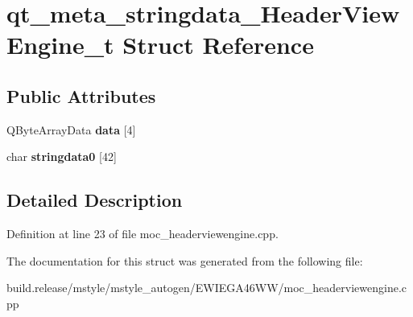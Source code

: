 \hypertarget{structqt__meta__stringdata___header_view_engine__t}{}\section{qt\+\_\+meta\+\_\+stringdata\+\_\+\+Header\+View\+Engine\+\_\+t Struct Reference}
\label{structqt__meta__stringdata___header_view_engine__t}
\subsection*{Public Attributes}
\begin{DoxyCompactItemize}
\item 
\mbox{\label{structqt__meta__stringdata___header_view_engine__t_a77814f1a2f2e2274ae135c850896cfdb}} 
Q\+Byte\+Array\+Data {\bfseries data} \mbox{[}4\mbox{]}
\item 
\mbox{\label{structqt__meta__stringdata___header_view_engine__t_a27b8ca00bbcbbdb67ede11d5e5d45a6b}} 
char {\bfseries stringdata0} \mbox{[}42\mbox{]}
\end{DoxyCompactItemize}


\subsection{Detailed Description}


Definition at line 23 of file moc\+\_\+headerviewengine.\+cpp.



The documentation for this struct was generated from the following file\+:\begin{DoxyCompactItemize}
\item 
build.\+release/mstyle/mstyle\+\_\+autogen/\+E\+W\+I\+E\+G\+A46\+W\+W/moc\+\_\+headerviewengine.\+cpp\end{DoxyCompactItemize}
